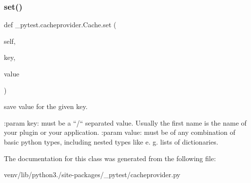 \subsubsection{\texorpdfstring{set()}{set()}}
{\footnotesize\ttfamily def \+\_\+pytest.\+cacheprovider.\+Cache.\+set (\begin{DoxyParamCaption}\item[{}]{self,  }\item[{}]{key,  }\item[{}]{value }\end{DoxyParamCaption})}

\begin{DoxyVerb}save value for the given key.

:param key: must be a ``/`` separated value. Usually the first
     name is the name of your plugin or your application.
:param value: must be of any combination of basic
       python types, including nested types
       like e. g. lists of dictionaries.
\end{DoxyVerb}
 

The documentation for this class was generated from the following file\+:\begin{DoxyCompactItemize}
\item 
venv/lib/python3./site-\/packages/\+\_\+pytest/cacheprovider.\+py\end{DoxyCompactItemize}
